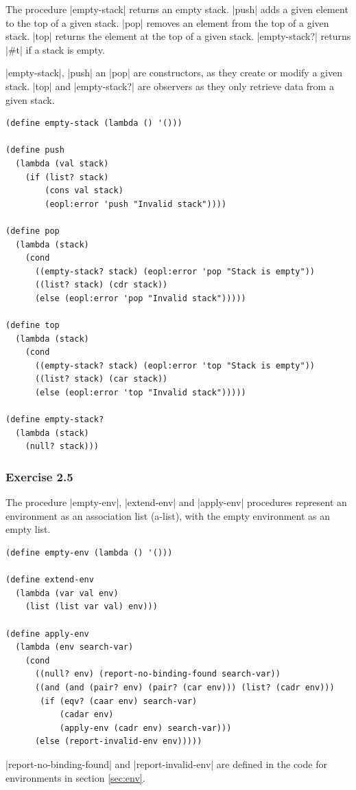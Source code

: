 \documentclass[a4paper]{article}
\begin{document}
The procedure |empty-stack| returns an empty stack. |push| adds a given element to the top of a given stack. |pop| removes an element from the top of a given stack. |top| returns the element at the top of a given stack. |empty-stack?| returns |#t| if a stack is empty.

|empty-stack|, |push| an |pop| are constructors, as they create or modify a given stack. |top| and |empty-stack?| are observers as they only retrieve data from a given stack.

\begin{lstlisting}
(define empty-stack (lambda () '()))

(define push
  (lambda (val stack)
    (if (list? stack)
        (cons val stack)
        (eopl:error 'push "Invalid stack"))))

(define pop
  (lambda (stack)
    (cond
      ((empty-stack? stack) (eopl:error 'pop "Stack is empty"))
      ((list? stack) (cdr stack))
      (else (eopl:error 'pop "Invalid stack")))))

(define top
  (lambda (stack)
    (cond
      ((empty-stack? stack) (eopl:error 'top "Stack is empty"))
      ((list? stack) (car stack))
      (else (eopl:error 'top "Invalid stack")))))
    
(define empty-stack?
  (lambda (stack)
    (null? stack)))
\end{lstlisting}

\subsubsection{Exercise 2.5}

The procedure |empty-env|, |extend-env| and |apply-env| procedures represent an environment as an association list (a-list), with the empty environment as an empty list.

\begin{lstlisting}
(define empty-env (lambda () '()))

(define extend-env
  (lambda (var val env)
    (list (list var val) env)))

(define apply-env
  (lambda (env search-var)
    (cond
      ((null? env) (report-no-binding-found search-var))
      ((and (and (pair? env) (pair? (car env))) (list? (cadr env)))
       (if (eqv? (caar env) search-var)
           (cadar env)
           (apply-env (cadr env) search-var)))
      (else (report-invalid-env env)))))
\end{lstlisting}

|report-no-binding-found| and |report-invalid-env| are defined in the code for environments in section \ref{sec:env}.
\end{document}

